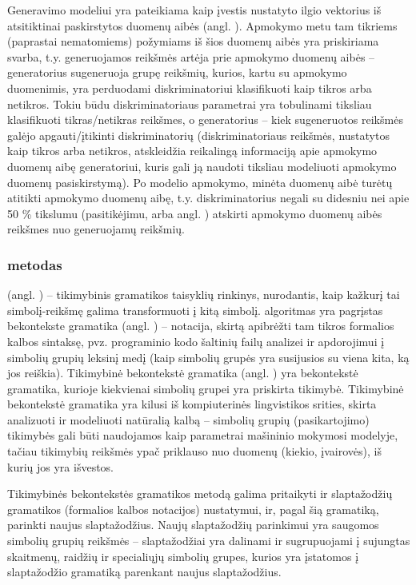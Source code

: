 \documentclass{VUMIFInfBakalaurinis}
\begin{document}
Generavimo modeliui yra pateikiama kaip įvestis nustatyto ilgio vektorius iš 
atsitiktinai paskirstytos duomenų aibės (angl. ). Apmokymo metu tam tikriems (paprastai nematomiems) požymiams iš 
šios duomenų aibės yra priskiriama svarba, t.y. generuojamos reikšmės artėja 
prie apmokymo duomenų aibės -- generatorius sugeneruoja grupę reikšmių, kurios, 
kartu su apmokymo duomenimis, yra perduodami diskriminatoriui klasifikuoti kaip 
tikros arba netikros. Tokiu būdu diskriminatoriaus parametrai yra tobulinami 
tiksliau klasifikuoti tikras/netikras reikšmes, o generatorius -- kiek 
sugeneruotos reikšmės galėjo apgauti/įtikinti diskriminatorių (diskriminatoriaus 
reikšmės, nustatytos kaip tikros arba netikros, atskleidžia reikalingą 
informaciją apie apmokymo duomenų aibę generatoriui, kuris gali ją naudoti 
tiksliau modeliuoti apmokymo duomenų pasiskirstymą). Po modelio apmokymo, minėta 
duomenų aibė turėtų atitikti apmokymo duomenų aibę, t.y. diskriminatorius negali 
su didesniu nei apie 50 \% tikslumu (pasitikėjimu, arba angl. 
) atskirti apmokymo duomenų aibės reikšmes nuo generuojamų 
reikšmių.

\subsubsection{ metodas}
 (angl. ) -- 
tikimybinis gramatikos taisyklių rinkinys, nurodantis, kaip kažkurį tai 
simbolį-reikšmę galima transformuoti į kitą simbolį.  algoritmas 
yra pagrįstas bekontekste gramatika (angl. ) -- 
notacija, skirtą apibrėžti tam tikros formalios kalbos sintaksę, pvz. 
programinio kodo šaltinių failų analizei ir apdorojimui į simbolių grupių 
leksinį medį (kaip simbolių grupės yra susijusios su viena kita, ką jos 
reiškia). Tikimybinė bekontekstė gramatika (angl. ) yra bekontekstė gramatika, kurioje kiekvienai simbolių 
grupei yra priskirta tikimybė. Tikimybinė bekontekstė gramatika yra kilusi iš 
kompiuterinės lingvistikos srities, skirta analizuoti ir modeliuoti natūralią 
kalbą -- simbolių grupių (pasikartojimo) tikimybės gali būti naudojamos kaip 
parametrai mašininio mokymosi modelyje, tačiau tikimybių reikšmės ypač priklauso 
nuo duomenų (kiekio, įvairovės), iš kurių jos yra išvestos.

Tikimybinės bekontekstės gramatikos metodą galima pritaikyti ir slaptažodžių 
gramatikos (formalios kalbos notacijos) nustatymui, ir, pagal šią gramatiką, 
parinkti naujus slaptažodžius. Naujų slaptažodžių parinkimui yra saugomos 
simbolių grupių reikšmės -- slaptažodžiai yra dalinami ir sugrupuojami į 
sujungtas skaitmenų, raidžių ir specialiųjų simbolių grupes, kurios yra 
įstatomos į slaptažodžio gramatiką parenkant naujus slaptažodžius.
\end{document}
